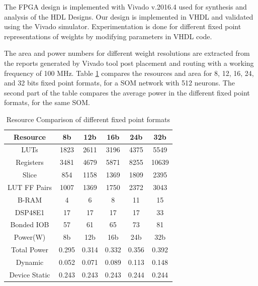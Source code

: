 \documentclass[a4paper,10pt]{article}
\begin{document}
The FPGA design is implemented with Vivado v.2016.4 used for synthesis and analysis of the HDL Designs. Our design is implemented in VHDL and validated using the Vivado simulator. Experimentation is done for different fixed point representations of weights by modifying parameters in VHDL code. 

The area and power numbers for different weight resolutions are extracted from the reports generated by Vivado tool post placement and routing with a working frequency of 100 MHz. Table \ref{table:1} compares the resources and area for 8, 12, 16, 24, and 32 bits fixed point formats, for a SOM network with 512 neurons. The second part of the table compares the average power in the different fixed point formats, for the same SOM.
\begin{table}[!htb]
	\centering
	\caption{Resource Comparison of different fixed point formats}
	\label{table:1}
	\begin{tabular}{ c |c | c| c |c | c } 
		\toprule
		Resource & 8b & 12b & 16b & 24b & 32b \\ 
		\midrule
		LUTs & 1823 & 2611 &3196 & 4375 & 5549 \\
		\hline
		Registers & 3481 & 4679 & 5871 & 8255 & 10639 \\ 
		\hline
		Slice & 854 & 1158 & 1369 &1809 & 2395 \\ 
		\hline
		LUT FF Pairs & 1007 & 1369 & 1750 & 2372 & 3043 \\
		\hline
		B-RAM & 4 & 6 & 8 & 11 & 15 \\
		\hline
		DSP48E1 & 17 & 17 & 17 & 17 & 33 \\
		\hline
		Bonded IOB & 57 & 61 & 65 & 73 & 81 \\
		\midrule
	
		\midrule
		Power(W) & 8b & 12b & 16b & 24b & 32b \\ 
		\midrule
		Total Power & 0.295 &0.314 &0.332 &0.356 &0.392 \\
		\hline
		Dynamic &0.052 &0.071 &0.089 &0.113 &0.148 \\ 
		\hline
		Device Static &0.243 &0.243 &0.243 &0.244 &0.244 \\ 
		\bottomrule
	\end{tabular}
\end{table}
\end{document}
